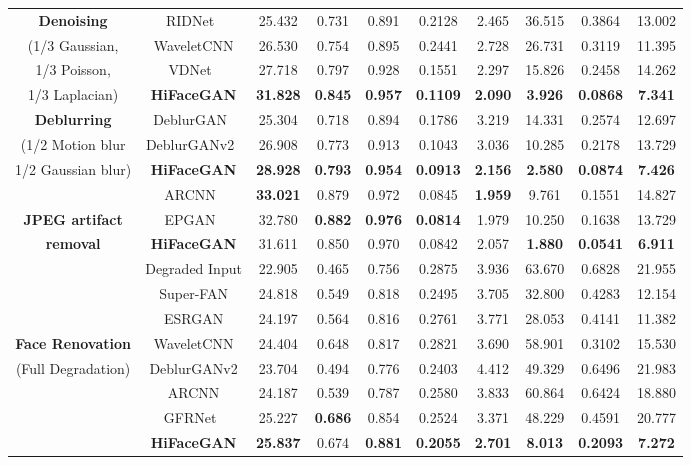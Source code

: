 \documentclass[sigconf]{acmart}
\begin{document}
\begin{table*}[!pt]
{\begin{tabular}{|c|c|ccc|cc|ccc|}
       \textbf{Denoising} & RIDNet~\cite{RIDNet} & 25.432 & 0.731 & 0.891 & 0.2128 & 2.465& 36.515 & 0.3864 & 13.002 \\
       (1/3 Gaussian, & WaveletCNN & 26.530 & 0.754 & 0.895 & 0.2441 & 2.728 & 26.731 & 0.3119 & 11.395 \\
       1/3 Poisson, & VDNet~\cite{VDNet} & 27.718 & 0.797 & 0.928 & 0.1551 & 2.297 & 15.826 & 0.2458 & 14.262 \\
       1/3 Laplacian) & \textbf{HiFaceGAN} & \textbf{31.828} & \textbf{0.845} & \textbf{0.957} & \textbf{0.1109} & \textbf{2.090} & \textbf{3.926} & \textbf{0.0868} & \textbf{7.341} \\
		\hline\hline

        \textbf{Deblurring} & DeblurGAN~\cite{DeblurGAN} & 25.304 & 0.718 & 0.894 & 0.1786 & 3.219 & 14.331 & 0.2574 & 12.697 \\
        (1/2 Motion blur& DeblurGANv2~\cite{DeblurGANv2} & 26.908 & 0.773 & 0.913 & 0.1043 & 3.036 & 10.285 & 0.2178 & 13.729 \\
       1/2 Gaussian blur)& \textbf{HiFaceGAN} & \textbf{28.928} & \textbf{0.793} & \textbf{0.954} & \textbf{0.0913} & \textbf{2.156} & \textbf{2.580} & \textbf{0.0874} & \textbf{7.426} \\
       \hline\hline

        & ARCNN~\cite{ARCNN} & \textbf{33.021} & 0.879 & 0.972 & 0.0845 & \textbf{1.959} & 9.761 & 0.1551 & 14.827 \\
       \textbf{JPEG artifact} & EPGAN~\cite{EPGAN} & 32.780 & \textbf{0.882} & \textbf{0.976} & \textbf{0.0814} & 1.979 & 10.250 & 0.1638 & 13.729 \\
       \textbf{removal} & \textbf{HiFaceGAN} & 31.611 & 0.850 & 0.970 & 0.0842 & 2.057& \textbf{1.880} & \textbf{0.0541} & \textbf{6.911} \\
       \hline\hline

        & Degraded Input & 22.905 & 0.465 & 0.756 & 0.2875 & 3.936 & 63.670 & 0.6828 & 21.955 \\
        & Super-FAN & 24.818 & 0.549 & 0.818 & 0.2495 & 3.705 & 32.800 & 0.4283 & 12.154 \\
        & ESRGAN & 24.197 & 0.564 & 0.816 & 0.2761 & 3.771 & 28.053 & 0.4141 & 11.382 \\
       \textbf{Face Renovation} & WaveletCNN & 24.404 & 0.648 & 0.817 & 0.2821 & 3.690 & 58.901 & 0.3102 & 15.530 \\
       (Full Degradation) & DeblurGANv2 & 23.704 & 0.494 & 0.776 & 0.2403 & 4.412 & 49.329 & 0.6496 & 21.983 \\
       & ARCNN & 24.187 & 0.539 & 0.787 & 0.2580 & 3.833 & 60.864 & 0.6424 & 18.880 \\
       & GFRNet~\cite{BlindFR-ECCV2018} & 25.227 & \textbf{0.686} & 0.854 & 0.2524 & 3.371 & 48.229 & 0.4591 & 20.777 \\
        & \textbf{HiFaceGAN} & \textbf{25.837} & 0.674 & \textbf{0.881} & \textbf{0.2055} & \textbf{2.701} & \textbf{8.013} & \textbf{0.2093} &\textbf{7.272} \\
		\hline\hline


\end{tabular}}
\end{table*}
\end{document}
